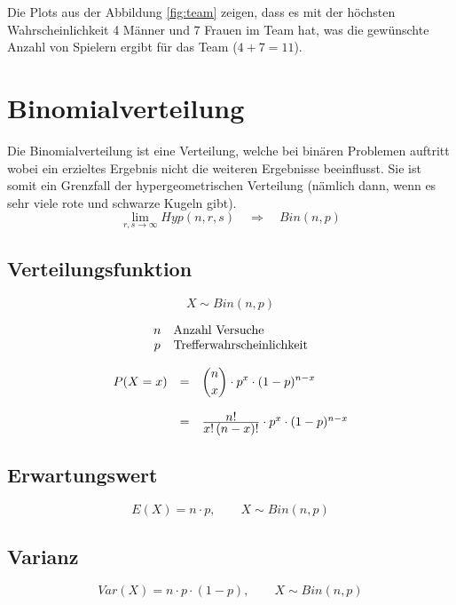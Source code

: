 \noindent
Die Plots aus der Abbildung \ref{fig:team} zeigen, dass es mit der 
höchsten Wahrscheinlichkeit
4 Männer und 7 Frauen im Team hat, was die gewünschte Anzahl von Spielern
ergibt für das Team ($4+7=11$). 

\clearpage
\newpage
\section{Binomialverteilung}
Die Binomialverteilung ist eine Verteilung, welche bei binären Problemen
auftritt wobei ein erzieltes Ergebnis nicht die weiteren Ergebnisse
beeinflusst. Sie ist somit ein Grenzfall der hypergeometrischen 
Verteilung (nämlich dann, wenn es sehr viele rote und schwarze 
Kugeln gibt).
\[ 
	\lim_{r,s \rightarrow \infty} Hyp(n,r,s) 
	\quad \Rightarrow \quad Bin(n,p)
\]

\subsection{Verteilungsfunktion}

\[ 
	X \sim Bin(n,p)
\]

\[ \begin{array}{c l} 
	n & \text{Anzahl Versuche} \\
	p & \text{Trefferwahrscheinlichkeit}
\end{array} \]

\[ \begin{array}{l c l} 
	P(X=x)
		&= 
		& \displaystyle \binom{n}{x} \cdot p^x 
			\cdot (1-p)^{n-x} \\
	& & \\
		&= 
		& \frac{\displaystyle n!}{\displaystyle x!\, (n-x)!} 
			\cdot p^x \cdot (1-p)^{n-x}
\end{array} \]

\subsection{Erwartungswert}

\[  
	E(X) = n \cdot p, \qquad X \sim Bin(n,p)
\]


\subsection{Varianz}

\[  
	Var(X) = n \cdot p \cdot (1-p), \qquad X \sim Bin(n,p)
\]

